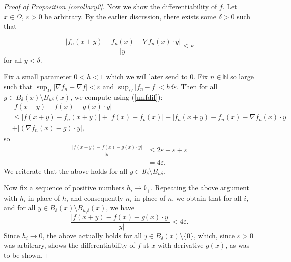\documentclass[10pt,a4paper]{amsart}
\begin{document}
\begin{proof}[Proof of Proposition \ref{corollary2}]
Now we show the differentiability of $f$. Let $x \in \Omega$, $\varepsilon > 0$ be arbitrary. By the earlier discussion, there exists some $\delta > 0$ such that

$$\frac{|f_n (x+y) - f_n (x) - \nabla f_n (x) \cdot y|}{|y|} \leq \varepsilon$$
for all $y < \delta$.

Fix a small parameter $0 < h < 1$ which we will later send to $0$. Fix $n \in \mathbb N$ so large such that $\sup_{\Omega} |\nabla f_n - \nabla f| < \varepsilon$ and $\sup_{\Omega} |f_n - f| < h \delta \varepsilon$. Then for all $y \in B_{\delta}(x) \setminus B_{h\delta}(x)$, we compute using (\ref{unifdif}):
$$\begin{aligned}&|f(x+y) - f(x) - g(x) \cdot y|\\&\leq |f(x+y) - f_n (x+y)| + |f(x) - f_n (x)| + |f_n (x+y) - f_n (x) - \nabla f_n (x) \cdot y| \\
&+ |(\nabla f_n (x) - g) \cdot y|,\end{aligned} $$
so
$$\begin{aligned}\frac{|f(x+y) - f(x) - g(x) \cdot y|}{|y|} & \leq 2 \varepsilon + \varepsilon + \varepsilon \\
& = 4\varepsilon.\end{aligned}$$
We reiterate that the above holds for all $y \in B_{\delta} \setminus B_{h\delta}$.

Now fix a sequence of positive numbers $h_i \to 0_+$. Repeating the above argument with $h_i$ in place of $h$, and consequently $n_i$ in place of $n$, we obtain that for all $i$, and for all $y \in B_\delta (x) \setminus B_{h_i \delta}(x)$, we have
$$\frac{|f(x+y) - f(x) - g(x) \cdot y|}{|y|} < 4\varepsilon.$$
Since $h_i \to 0$, the above actually holds for all $y \in B_\delta(x) \setminus \{0\}$, which, since $\varepsilon > 0$ was arbitrary, shows the differentiability of $f$ at $x$ with derivative $g(x)$, as was to be shown.
\end{proof}
\end{document}
